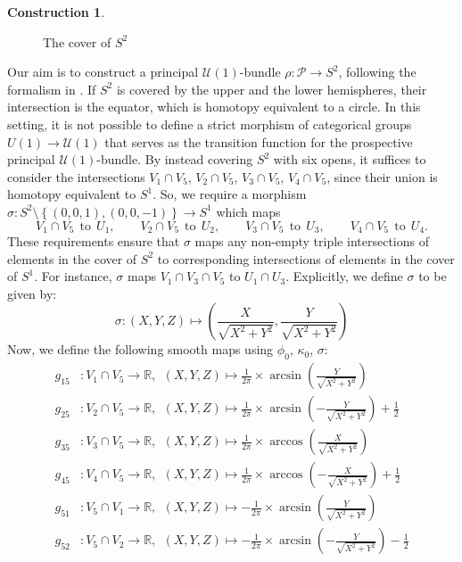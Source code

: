 \documentclass{article}
\theoremstyle{plain}
\theoremstyle{definition}
\newtheorem{const}[thm]{Construction}
\begin{document}
\begin{const}
\begin{figure}[H]
{\begin{tikzpicture}
\end{tikzpicture}
}
\caption{The cover of $S^2$}
\label{coverofs2}
\end{figure}
Our aim is to construct a principal $\mathcal{U}(1)$-bundle $\rho:\mathcal{P} \longrightarrow S^2$, following the formalism in \cite[Remark 2.16 on page 583]{MR2805195}. If $S^2$ is covered by the upper and the lower hemispheres, their intersection is the equator, which is homotopy equivalent to a circle. In this setting, it is not possible to define a strict morphism of categorical groups $U(1) \longrightarrow \mathcal{U}(1)$ that serves as the transition function for the prospective principal $\mathcal{U}(1)$-bundle. By instead covering $S^2$ with six opens, it suffices to consider the intersections $V_1 \cap V_5$, $V_2 \cap V_5$, $V_3 \cap V_5$, $V_4 \cap V_5$, since their union is homotopy equivalent to $S^1$. So, we require a morphism $\sigma:S^2 \setminus \left\{(0,0,1),(0,0,-1)\right\} \longrightarrow S^1$ which maps
\[
V_1 \cap V_5 ~~ \text{to} ~~ U_1, \qquad V_2 \cap V_5 ~~ \text{to} ~~ U_2, \qquad V_3 \cap V_5 ~~ \text{to} ~~ U_3, \qquad V_4 \cap V_5 ~~ \text{to} ~~ U_4.
\]
These requirements ensure that $\sigma$ maps any non-empty triple intersections of elements in the cover of $S^2$ to corresponding intersections of elements in the cover of $S^1$. For instance, $\sigma$ maps $V_1 \cap V_3 \cap V_5$ to $U_1 \cap U_3$. Explicitly, we define $\sigma$ to be given by:
$$\sigma:(X,Y,Z) \mapsto (\frac{X}{\sqrt{X^2+Y^2}},\frac{Y}{\sqrt{X^2+Y^2}})$$
Now, we define the following smooth maps using $\phi_0$, $\kappa_0$, $\sigma$:
\begin{align*}
g_{1 5} & : V_1 \cap V_5 \longrightarrow \mathbb{R}, ~~ (X,Y,Z) \mapsto \frac{1}{2\pi} \times \arcsin(\frac{Y}{\sqrt{X^2+Y^2}}) \\
g_{2 5} & : V_2 \cap V_5 \longrightarrow \mathbb{R}, ~~ (X,Y,Z) \mapsto \frac{1}{2\pi} \times \arcsin(- \frac{Y}{\sqrt{X^2+Y^2}}) + \frac{1}{2} \\
g_{3 5} & : V_3 \cap V_5 \longrightarrow \mathbb{R}, ~~ (X,Y,Z) \mapsto \frac{1}{2\pi} \times \arccos(\frac{X}{\sqrt{X^2+Y^2}}) \\
g_{4 5} & : V_4 \cap V_5 \longrightarrow \mathbb{R}, ~~ (X,Y,Z) \mapsto \frac{1}{2\pi} \times \arccos(-\frac{X}{\sqrt{X^2+Y^2}}) + \frac{1}{2} \\
g_{5 1} & : V_5 \cap V_1 \longrightarrow \mathbb{R}, ~~ (X,Y,Z) \mapsto - \frac{1}{2\pi} \times \arcsin(\frac{Y}{\sqrt{X^2+Y^2}}) \\
g_{5 2} & : V_5 \cap V_2 \longrightarrow \mathbb{R}, ~~ (X,Y,Z) \mapsto - \frac{1}{2\pi} \times \arcsin(- \frac{Y}{\sqrt{X^2+Y^2}}) - \frac{1}{2} \\

\end{align*}
\end{const}
\end{document}
